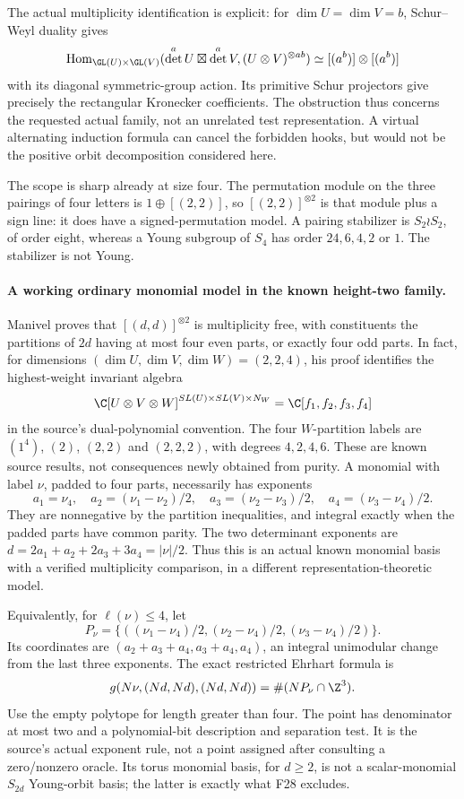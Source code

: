\documentclass[11pt,a4paper]{article}
\newcommand{\Hom}{\operatorname{Hom}}\newcommand{\Spec}{\operatorname{Spec}}\newcommand{\Tr}{\operatorname{Tr}}\newcommand{\rank}{\operatorname{rank}}\newcommand{\Sym}{\operatorname{Sym}}\newcommand{\Res}{\operatorname{Res}}\newcommand{\IC}{\operatorname{IC}}\newcommand{\Gr}{\operatorname{Gr}}\newcommand{\Rep}{\operatorname{Rep}}\newcommand{\Frob}{\operatorname{Frob}}\newcommand{\End}{\operatorname{End}}
\renewcommand{\S}{\ensuremath{\mathsection}}
\newcommand{\fid}[1]{\textsf{#1}}\newcommand{\gate}[1]{\textsf{#1}}
\theoremstyle{named}\newtheorem{finding}{Finding}[section]
\theoremstyle{definition}\newtheorem{definition}[finding]{Definition}
\theoremstyle{remark}\newtheorem{remark}[finding]{Remark}
\begin{document}
The actual multiplicity identification is explicit: for $\dim U=\dim V=b$,
Schur--Weyl duality gives
\[
 \Hom_{\GL(U)\times\GL(V)}
 (\det^aU\boxtimes\det^aV,(U\otimes V)^{\otimes ab})
 \simeq[(a^b)]\otimes[(a^b)]
\]
with its diagonal symmetric-group action. Its primitive Schur
projectors give precisely the rectangular Kronecker coefficients.
The obstruction thus concerns the requested actual family, not an
unrelated test representation. A virtual alternating induction formula
can cancel the forbidden hooks, but would not be the positive orbit
decomposition considered here.

The scope is sharp already at size four. The permutation module on
the three pairings of four letters is $1\oplus[(2,2)]$, so
$[(2,2)]^{\otimes2}$ is that module plus a sign line: it does have
a signed-permutation model. A pairing stabilizer is
$S_2\wr S_2$, of order eight, whereas a Young subgroup of $S_4$ has
order $24,6,4,2$ or $1$. The stabilizer is not Young.

\paragraph{A working ordinary monomial model in the known height-two family.}
Manivel \cite[Theorem~1, p.~1; \S\S2--3, pp.~2--4]{Manivel} proves
that $[(d,d)]^{\otimes2}$ is multiplicity free, with constituents the
partitions of $2d$ having at most four even parts, or exactly four odd
parts. In fact, for dimensions $(\dim U,\dim V,\dim W)=(2,2,4)$,
his proof identifies the highest-weight invariant algebra
\[
 \C[U\otimes V\otimes W]^{SL(U)\times SL(V)\times N_W}
 =\C[f_1,f_2,f_3,f_4]
\]
in the source's dual-polynomial convention. The four $W$-partition
labels are $(1^4)$, $(2)$, $(2,2)$ and $(2,2,2)$, with degrees $4,2,4,6$.
These are known source results, not consequences newly obtained from
purity. A monomial with label $\nu$, padded to four parts, necessarily
has exponents
\[
 a_1=\nu_4,\quad a_2=(\nu_1-\nu_2)/2,\quad
 a_3=(\nu_2-\nu_3)/2,\quad a_4=(\nu_3-\nu_4)/2.
\]
They are nonnegative by the partition inequalities, and integral
exactly when the padded parts have common parity. The two determinant
exponents are $d=2a_1+a_2+2a_3+3a_4=|\nu|/2$.
Thus this is an actual known monomial basis with a verified
multiplicity comparison, in a different representation-theoretic model.

Equivalently, for $\ell(\nu)\le4$, let
\[
 P_\nu=\{((\nu_1-\nu_4)/2,(\nu_2-\nu_4)/2,(\nu_3-\nu_4)/2)\}.
\]
Its coordinates are $(a_2+a_3+a_4,a_3+a_4,a_4)$, an integral
unimodular change from the last three exponents. The exact restricted
Ehrhart formula is
\[
 g(N\nu,(Nd,Nd),(Nd,Nd))=\#(NP_\nu\cap\Z^3).
\]
Use the empty polytope for length greater than four. The point has
denominator at most two and a polynomial-bit description and
separation test. It is the source's actual exponent rule, not a
point assigned after consulting a zero/nonzero oracle. Its torus
monomial basis, for $d\ge2$, is not a scalar-monomial $S_{2d}$ Young-orbit basis;
the latter is exactly what \fid{F28} excludes.
\end{document}
